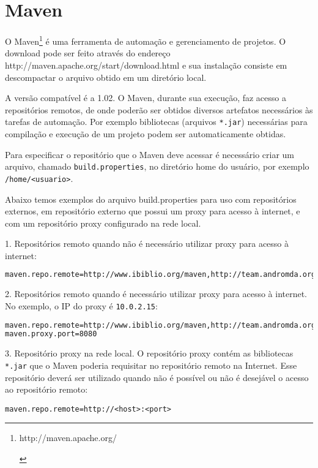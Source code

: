 \section{Maven}
O Maven\footnote{\hypertarget{http://maven.apache.org/}{http://maven.apache.org/}} é uma ferramenta de automação e gerenciamento de projetos. O download pode ser feito através do endereço \hypertarget{http://maven.apache.org/start/download.html}{http://maven.apache.org/start/download.html} e sua instalação consiste em descompactar o arquivo obtido em um diretório local. 

A versão compatível é a 1.02. O Maven, durante sua execução, faz acesso a repositórios remotos, de onde poderão ser obtidos diversos artefatos necessários às tarefas de automação. Por exemplo bibliotecas (arquivos \texttt{*.jar}) necessárias para compilação e execução de um projeto podem ser automaticamente obtidas. 

Para especificar o repositório que o Maven deve acessar é necessário criar um arquivo, chamado \texttt{build.properties}, no diretório home do usuário, por exemplo \texttt{/home/<usuario>}. 

Abaixo temos exemplos do arquivo build.properties para uso com repositórios externos, em repositório externo que possui um proxy para acesso à internet, e com um repositório proxy configurado na rede local. 

1. Repositórios remoto quando não é necessário utilizar proxy para acesso à internet: 

\begin{lstlisting}[language=bash]
maven.repo.remote=http://www.ibiblio.org/maven,http://team.andromda.org/maven 
\end{lstlisting}

2. Repositórios remoto quando é necessário utilizar proxy para acesso à internet. No exemplo, o IP do proxy é \texttt{10.0.2.15}: 

\begin{lstlisting}[language=bash]
maven.repo.remote=http://www.ibiblio.org/maven,http://team.andromda.org/maven maven.proxy.host=10.0.2.15 
maven.proxy.port=8080 
\end{lstlisting}

3. Repositório proxy na rede local. O repositório proxy contém as bibliotecas \texttt{*.jar} que o Maven poderia requisitar no repositório remoto na Internet. Esse repositório deverá ser utilizado quando não é possível ou não é desejável o acesso ao repositório remoto:

\begin{verbatim}
maven.repo.remote=http://<host>:<port> 
\end{verbatim}

